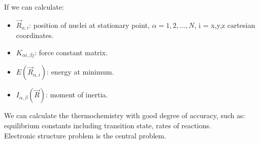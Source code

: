 \documentclass[a4paper, 12pt]{article}
\begin{document}
\begin{summary}{}{}
   If we can calculate:
    \begin{itemize}
    	\item  $\vec{R}_{\alpha,i}$: position of nuclei at stationary point, $\alpha=1,2,...,N$, i = x,y,z cartesian coordinates.
    	\item $K_{\alpha i,\beta j}$: force constant matrix.
    	\item $E(\vec{R}_{\alpha, i})$: energy at minimum.
    	\item $I_{\alpha,\beta}(\vec{R})$: moment of inertia.
    \end{itemize}
    
    \indent We can calculate the thermochemistry with good degree of accuracy, such as: equilibrium constants including transition state, rates of reactions.\\
     \indent Electronic structure problem is the central problem.   
\end{summary}
\end{document}
